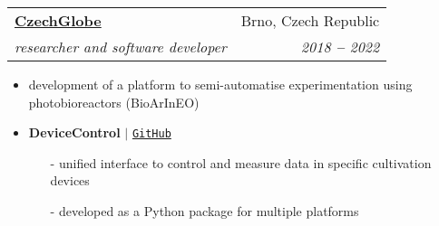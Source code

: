 \documentclass[letterpaper,11pt]{article}
\makeatletter
\newcommand{\resumeSubheading}[4]{
  \vspace{-2pt}\item
    \begin{tabular*}{0.97\textwidth}[t]{l@{\extracolsep{\fill}}r}
      \textbf{#1} & #2 \\
      \textit{\small#3} & \textit{\small #4} \\
    \end{tabular*}\vspace{-7pt}
}
\makeatother
\begin{document}
  \resumeSubheading
  {\href{http://czechglobe.cz/en/}{CzechGlobe}}{Brno, Czech Republic}
  {researcher and software developer}{2018 \textbf{--} 2022}
  \small{
    \begin{itemize}
      \item development of a platform to semi-automatise experimentation using photobioreactors (BioArInEO)
      \item \textbf{DeviceControl} $|$ \href{https://github.com/SmartBioTech/DeviceControl}{\color{blue}\texttt{GitHub}} \vspace{-2pt}
      \begin{itemize}
        \item[-] unified interface to control and measure data in specific cultivation devices \vspace{-2pt}
        \item[-] developed as a Python package for multiple platforms \vspace{-2pt}
      \end{itemize}
    \end{itemize}
  }

  \vspace{10pt}
    
\end{document}
